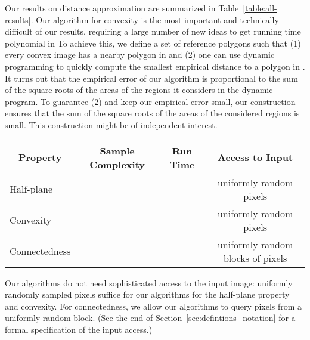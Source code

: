 \documentclass[11pt,english]{article}
\numberwithin{figure}{section}
\begin{document}
Our results on distance approximation are summarized  in Table~\ref{table:all-results}. Our algorithm for convexity is the most important and technically difficult of our results, requiring a large number of new ideas to get running time polynomial in  To achieve this, we define a set of reference polygons   such that (1) every convex image has a nearby polygon in  and (2) one can use dynamic programming to quickly compute the smallest empirical distance to a polygon in . It turns out that the empirical error of our algorithm is proportional to the sum of the square roots of the areas of the regions it considers in the dynamic program. To guarantee (2) and keep our empirical error small, our construction ensures that the sum of the square roots of the areas of the considered regions is small.
This construction might be of independent interest.
\begin{table*}[t]
\begin{center}
\begin{tabular}{| l || c | c| c |}
\hline
\multicolumn{1}{|c||}{Property}& Sample Complexity &  Run Time & Access to Input
\\
\hline
Half-plane  &   &  & uniformly random pixels
\\
Convexity &   &  & uniformly random pixels
\\
Connectedness &   \ \ \ \ &  &uniformly random blocks of pixels
\\
\hline
\end{tabular}
\end{center}
\caption{Our results on distance approximation.
To get complexity of -tolerant testing, substitute .
}
\label{table:all-results}
\end{table*}
Our algorithms do not need sophisticated access to the input image: uniformly randomly sampled pixels suffice for our algorithms for the half-plane property and convexity. For connectedness, we allow our algorithms to query pixels from a uniformly random block. (See the end of Section~\ref{sec:defintions_notation} for a formal specification of the input access.)
\end{document}

